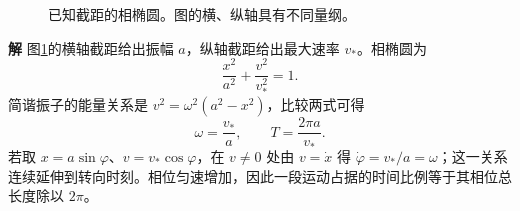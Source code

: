 \documentclass[11pt,openany,fontset=fandol]{ctexbook}
\theoremstyle{definition}\newtheorem{example}{例}[chapter]\newtheorem{exercise}{习题}[chapter]
\newcommand{\SolutionStart}{\par\medskip\ifdim\pagetotal>0pt\ifdim\dimexpr\pagegoal-\pagetotal\relax<3\baselineskip\newpage\fi\fi\noindent\textbf{解}\quad\ignorespaces}
\newenvironment{solution}{\SolutionStart}{\par\medskip}
\begin{document}
\begin{minipage}{\textwidth}
\begin{figure}[H]
\caption{已知截距的相椭圆。图的横、纵轴具有不同量纲。}\label{mp4:fig:l4-h3-q}
\end{figure}
\end{minipage}\par\medskip
\begin{solution}
图\ref{mp4:fig:l4-h3-q}的横轴截距给出振幅 $a$，纵轴截距给出最大速率 $v_*$。相椭圆为
\[
\frac{x^2}{a^2}+\frac{v^2}{v_*^2}=1.
\]
简谐振子的能量关系是 $v^2=\omega^2(a^2-x^2)$，比较两式可得
\[
\omega=\frac{v_*}{a},\qquad T=\frac{2\pi a}{v_*}.
\]
若取 $x=a\sin\varphi$、$v=v_*\cos\varphi$，在 $v\ne0$ 处由 $v=\dot x$ 得 $\dot\varphi=v_*/a=\omega$；这一关系连续延伸到转向时刻。相位匀速增加，因此一段运动占据的时间比例等于其相位总长度除以 $2\pi$。


\end{solution}
\end{document}
